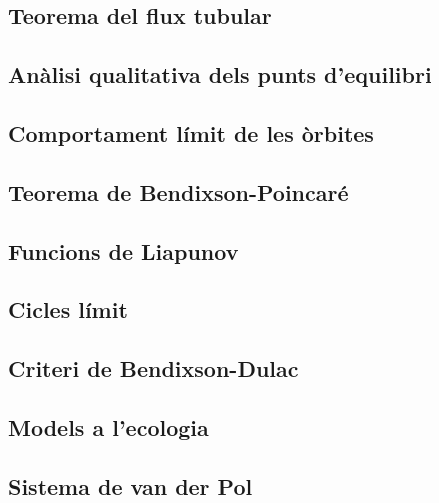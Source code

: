 \documentclass[../Apunts.tex]{subfiles}
\begin{document}
	\subsection{Teorema del flux tubular}
	\subsection{Anàlisi qualitativa dels punts d'equilibri}
	\subsection{Comportament límit de les òrbites}
	\subsection{Teorema de Bendixson-Poincaré}
	\subsection{Funcions de Liapunov}
	\subsection{Cicles límit}
	\subsection{Criteri de Bendixson-Dulac}
	\subsection{Models a l'ecologia}
	\subsection{Sistema de van der Pol}
\end{document}
